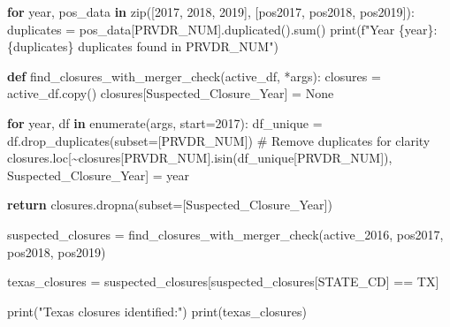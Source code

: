 \documentclass[
  letterpaper,
  DIV=11,
  numbers=noendperiod]{scrartcl}
\newenvironment{Shaded}{\begin{snugshade}}{\end{snugshade}}
\newcommand{\BuiltInTok}[1]{\textcolor[rgb]{0.00,0.23,0.31}{#1}}
\newcommand{\CommentTok}[1]{\textcolor[rgb]{0.37,0.37,0.37}{#1}}
\newcommand{\ControlFlowTok}[1]{\textcolor[rgb]{0.00,0.23,0.31}{\textbf{#1}}}
\newcommand{\DecValTok}[1]{\textcolor[rgb]{0.68,0.00,0.00}{#1}}
\newcommand{\KeywordTok}[1]{\textcolor[rgb]{0.00,0.23,0.31}{\textbf{#1}}}
\newcommand{\NormalTok}[1]{\textcolor[rgb]{0.00,0.23,0.31}{#1}}
\newcommand{\OperatorTok}[1]{\textcolor[rgb]{0.37,0.37,0.37}{#1}}
\newcommand{\SpecialCharTok}[1]{\textcolor[rgb]{0.37,0.37,0.37}{#1}}
\newcommand{\SpecialStringTok}[1]{\textcolor[rgb]{0.13,0.47,0.30}{#1}}
\newcommand{\StringTok}[1]{\textcolor[rgb]{0.13,0.47,0.30}{#1}}
\newcommand{\VariableTok}[1]{\textcolor[rgb]{0.07,0.07,0.07}{#1}}
\begin{document}
\begin{Shaded}
\begin{Highlighting}[]
\ControlFlowTok{for}\NormalTok{ year, pos\_data }\KeywordTok{in} \BuiltInTok{zip}\NormalTok{([}\DecValTok{2017}\NormalTok{, }\DecValTok{2018}\NormalTok{, }\DecValTok{2019}\NormalTok{], [pos2017, pos2018, pos2019]):}
\NormalTok{    duplicates }\OperatorTok{=}\NormalTok{ pos\_data[}\StringTok{\textquotesingle{}PRVDR\_NUM\textquotesingle{}}\NormalTok{].duplicated().}\BuiltInTok{sum}\NormalTok{()}
    \BuiltInTok{print}\NormalTok{(}\SpecialStringTok{f"Year }\SpecialCharTok{\{}\NormalTok{year}\SpecialCharTok{\}}\SpecialStringTok{: }\SpecialCharTok{\{}\NormalTok{duplicates}\SpecialCharTok{\}}\SpecialStringTok{ duplicates found in PRVDR\_NUM"}\NormalTok{)}

\KeywordTok{def}\NormalTok{ find\_closures\_with\_merger\_check(active\_df, }\OperatorTok{*}\NormalTok{args):}
\NormalTok{    closures }\OperatorTok{=}\NormalTok{ active\_df.copy()}
\NormalTok{    closures[}\StringTok{\textquotesingle{}Suspected\_Closure\_Year\textquotesingle{}}\NormalTok{] }\OperatorTok{=} \VariableTok{None}

    \ControlFlowTok{for}\NormalTok{ year, df }\KeywordTok{in} \BuiltInTok{enumerate}\NormalTok{(args, start}\OperatorTok{=}\DecValTok{2017}\NormalTok{):}
\NormalTok{        df\_unique }\OperatorTok{=}\NormalTok{ df.drop\_duplicates(subset}\OperatorTok{=}\NormalTok{[}\StringTok{\textquotesingle{}PRVDR\_NUM\textquotesingle{}}\NormalTok{])  }\CommentTok{\# Remove duplicates for clarity}
\NormalTok{        closures.loc[}\OperatorTok{\textasciitilde{}}\NormalTok{closures[}\StringTok{\textquotesingle{}PRVDR\_NUM\textquotesingle{}}\NormalTok{].isin(df\_unique[}\StringTok{\textquotesingle{}PRVDR\_NUM\textquotesingle{}}\NormalTok{]), }\StringTok{\textquotesingle{}Suspected\_Closure\_Year\textquotesingle{}}\NormalTok{] }\OperatorTok{=}\NormalTok{ year}

    \ControlFlowTok{return}\NormalTok{ closures.dropna(subset}\OperatorTok{=}\NormalTok{[}\StringTok{\textquotesingle{}Suspected\_Closure\_Year\textquotesingle{}}\NormalTok{])}

\NormalTok{suspected\_closures }\OperatorTok{=}\NormalTok{ find\_closures\_with\_merger\_check(active\_2016, pos2017, pos2018, pos2019)}


\NormalTok{texas\_closures }\OperatorTok{=}\NormalTok{ suspected\_closures[suspected\_closures[}\StringTok{\textquotesingle{}STATE\_CD\textquotesingle{}}\NormalTok{] }\OperatorTok{==} \StringTok{\textquotesingle{}TX\textquotesingle{}}\NormalTok{]}

\BuiltInTok{print}\NormalTok{(}\StringTok{"Texas closures identified:"}\NormalTok{)}
\BuiltInTok{print}\NormalTok{(texas\_closures)}
\end{Highlighting}
\end{Shaded}
\end{document}
